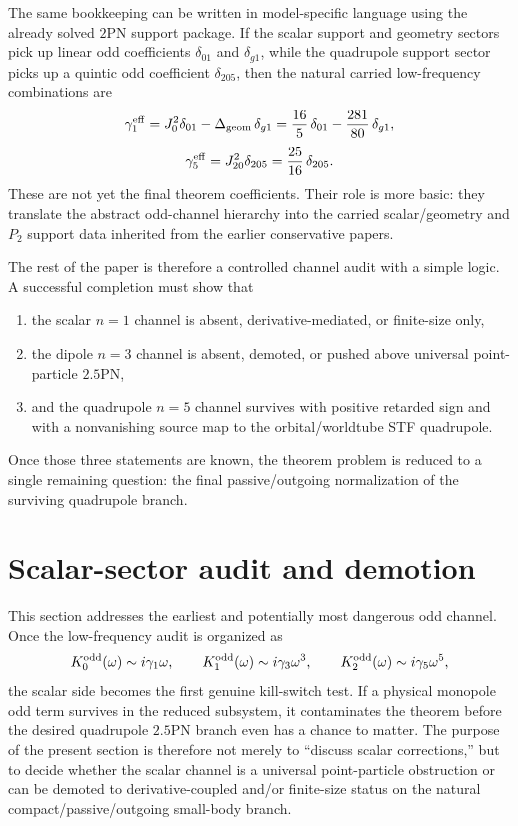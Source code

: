 \documentclass[11pt]{article}
\begin{document}
The same bookkeeping can be written in model-specific language using the already
solved $2$PN support package.  If the scalar support and geometry sectors pick up
linear odd coefficients $\delta_{01}$ and $\delta_{g1}$, while the quadrupole
support sector picks up a quintic odd coefficient $\delta_{205}$, then the
natural carried low-frequency combinations are
\[
\gamma_1^{\rm eff}
=
J_0^2\delta_{01}-\Delta_{\rm geom}\,\delta_{g1}
=
\frac{16}{5}\,\delta_{01}-\frac{281}{80}\,\delta_{g1},
\]
\[
\gamma_5^{\rm eff}
=
J_{20}^2\delta_{205}
=
\frac{25}{16}\,\delta_{205}.
\]
These are not yet the final theorem coefficients.  Their role is more basic: they
translate the abstract odd-channel hierarchy into the carried scalar/geometry and
$P_2$ support data inherited from the earlier conservative papers.

The rest of the paper is therefore a controlled channel audit with a simple logic.
A successful completion must show that
\begin{enumerate}
  \item the scalar $n=1$ channel is absent, derivative-mediated, or finite-size
  only,
  \item the dipole $n=3$ channel is absent, demoted, or pushed above universal
  point-particle $2.5$PN,
  \item and the quadrupole $n=5$ channel survives with positive retarded sign and
  with a nonvanishing source map to the orbital/worldtube STF quadrupole.
\end{enumerate}
Once those three statements are known, the theorem problem is reduced to a single
remaining question: the final passive/outgoing normalization of the surviving
quadrupole branch.

\section{Scalar-sector audit and demotion}
\label{sec:scalar-audit-demotion}

This section addresses the earliest and potentially most dangerous odd channel.
Once the low-frequency audit is organized as
\[
K_0^{\rm odd}(\omega)\sim i\gamma_1\omega,
\qquad
K_1^{\rm odd}(\omega)\sim i\gamma_3\omega^3,
\qquad
K_2^{\rm odd}(\omega)\sim i\gamma_5\omega^5,
\]
the scalar side becomes the first genuine kill-switch test.  If a physical
monopole odd term survives in the reduced subsystem, it contaminates the theorem
before the desired quadrupole $2.5$PN branch even has a chance to matter.  The
purpose of the present section is therefore not merely to ``discuss scalar
corrections,'' but to decide whether the scalar channel is a universal
point-particle obstruction or can be demoted to derivative-coupled and/or
finite-size status on the natural compact/passive/outgoing small-body branch.
\end{document}
